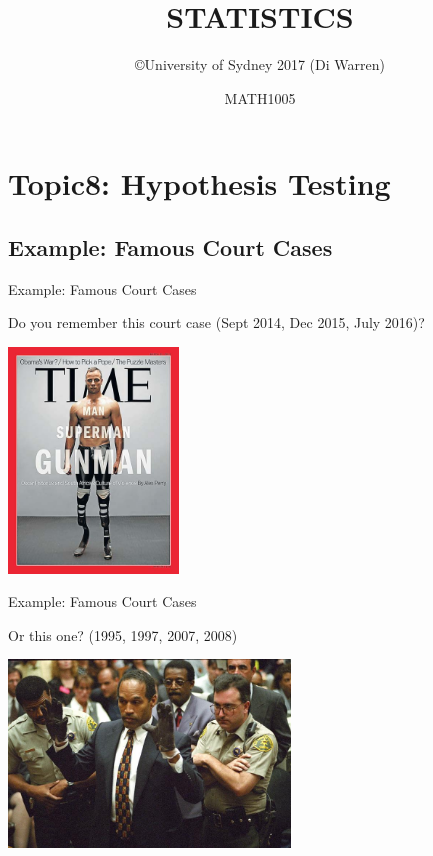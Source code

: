 \documentclass[t,xcolor=pdftex,dvipsnames,table]{beamer}
\title{\Huge STATISTICS}
\subtitle{}
\author{\copyright University of Sydney 2017 (Di Warren)}
\date{MATH1005}
\begin{document}
\section[8]{Topic8: Hypothesis Testing}

\subsection[]{Example: Famous Court Cases}
\begin{frame}[fragile]{Example: Famous Court Cases}

Do you remember this court case (Sept 2014, Dec 2015, July 2016)?
\href{https://en.wikipedia.org/wiki/Trial_of_Oscar_Pistorius}{}

\begin{center}
\includegraphics[height=6cm]{../images/PistoriusTime.jpg}
\end{center}
\end{frame}

\begin{frame}[fragile]{Example: Famous Court Cases}

Or this one? (1995, 1997, 2007, 2008)
\href{https://en.wikipedia.org/wiki/O._J._Simpson}{}
\begin{center}
\includegraphics[height=5cm]{../images/OJSimpson.jpg}
\end{center}
\end{frame}
\end{document}
